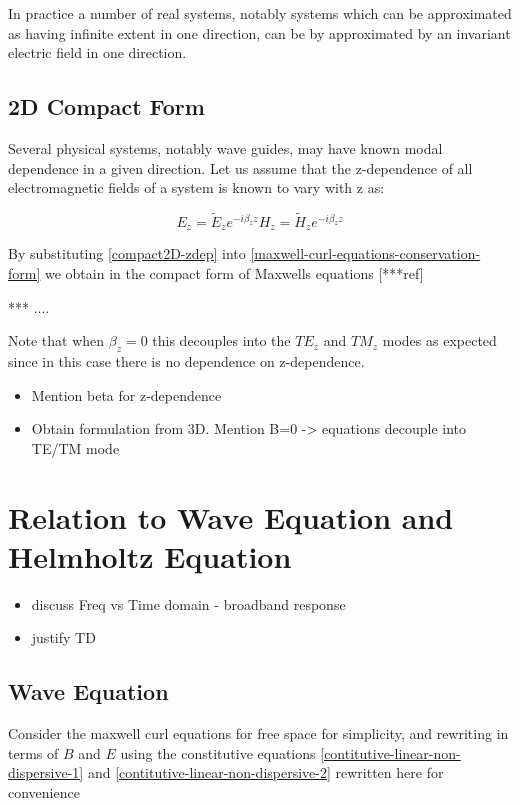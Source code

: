 In practice a number of real systems, notably systems which can be approximated as having infinite extent in one direction, can be by approximated by an invariant electric field in one direction.

\subsection{2D Compact Form}

Several physical systems, notably wave guides, may have known modal dependence in a given direction. Let us assume that the z-dependence of all electromagnetic fields of a system is known to vary with z as:

\begin{equation}
    E_z = \tilde{E}_z e^{-i \beta_z z}
    H_z = \tilde{H}_z e^{-i \beta_z z}
\label{compact2D-zdep}
\end{equation}

By substituting \ref{compact2D-zdep} into \ref{maxwell-curl-equations-conservation-form} we obtain in the compact form of Maxwells equations [***ref]

*** ....

Note that when $\beta_z = 0$ this decouples into the $TE_z$ and $TM_z$ modes as expected since in this case there is no dependence on z-dependence.

\begin{itemize}
  \item Mention beta for z-dependence
  \item Obtain formulation from 3D. Mention B=0 -> equations decouple into TE/TM mode
\end{itemize}

\section{Relation to Wave Equation and Helmholtz Equation}
\begin{itemize}
  \item discuss Freq vs Time domain - broadband response
  \item justify TD
\end{itemize}

\subsection{Wave Equation}

Consider the maxwell curl equations for free space for simplicity, and rewriting in terms of $B$ and $E$ using the constitutive equations \ref{contitutive-linear-non-dispersive-1} and \ref{contitutive-linear-non-dispersive-2} rewritten here for convenience

